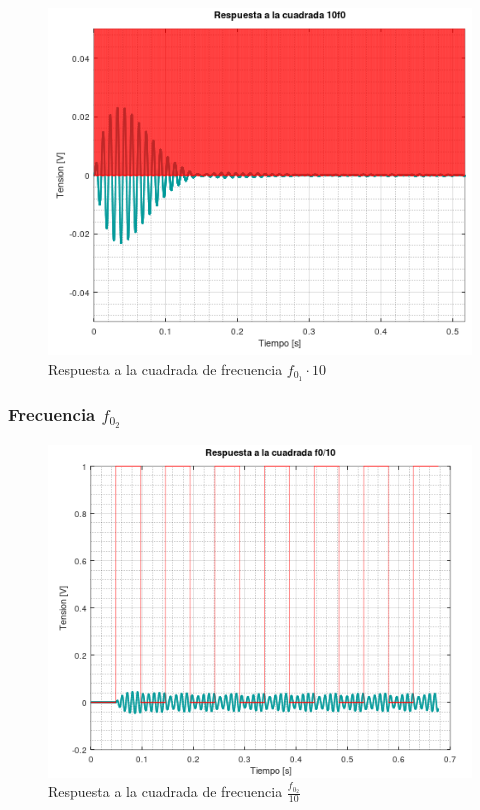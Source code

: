 \documentclass[11pt,a4paper]{report}
\begin{document}
\newpage
\begin{figure}[h!]
\includegraphics[scale=1]{RtaCuadradaWo13.png}
\caption{Respuesta a la cuadrada de frecuencia $f_{0_{1}} \cdot 10$}
\end{figure}

\newpage
\subsubsection*{Frecuencia $f_{0_{2}}$}

\begin{figure}[h!]
\includegraphics[scale=1]{RtaCuadradaWo21.png}
\caption{Respuesta a la cuadrada de frecuencia $\frac{f_{0_{2}}}{10}$}
\end{figure}
\end{document}
